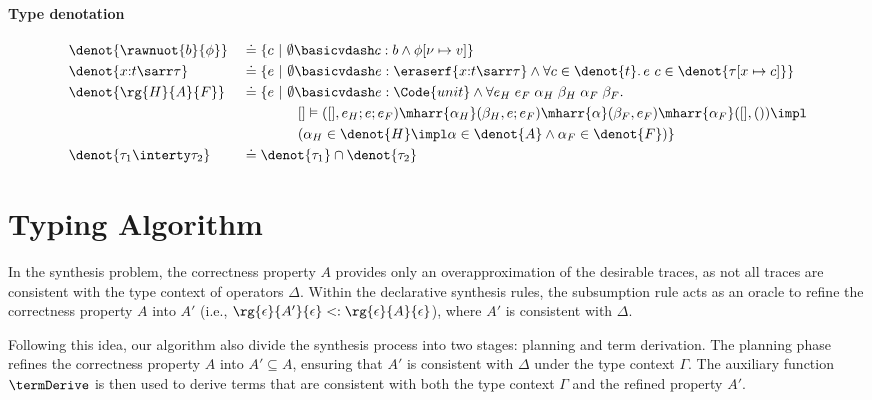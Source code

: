 \paragraph{Type denotation}
{\footnotesize\begin{align*}
  &\denot{ \rawnuot{b}{\phi} } &&\doteq \{ c ~|~ \emptyset
                                       \basicvdash c : b \land
                                       \phi[\nu\mapsto v] \}
  \\ &\denot{ x{:}t\sarr\tau } &&\doteq \{ e ~|~ \emptyset \basicvdash e : \eraserf{x{:}t\sarr\tau} \land
                                           \forall c \in \denot{ t }.\, e\ c \in  \denot{ \tau[x\mapsto c ] } \}
  \\ &\denot{ \rg{H}{A}{F} } &&\doteq \{ e ~|~ \emptyset \basicvdash e : \Code{unit} \land \forall e_H\;e_F\;\alpha_H\;\beta_H\;\alpha_F\;\beta_F.
  \\&&& \qquad\qquad  [] \vDash ([], e_H;e;e_F) \mharr{\alpha_H} (\beta_H, e;e_F) \mharr{\alpha} (\beta_F, e_F) \mharr{\alpha_F} ([], ()) \impl
  \\&&& \qquad\qquad (\alpha_H \in\denot{H} \impl \alpha \in\denot{A} \land \alpha_F\in\denot{F}) \}
  \\ &\denot{ \tau_1 \interty \tau_2 } &&\doteq \denot{\tau_1} \cap \denot{\tau_2}
\end{align*}}

\section{Typing Algorithm}

In the synthesis problem, the correctness property $A$ provides only an overapproximation of the desirable traces, as not all traces are consistent with the type context of operators $\Delta$. Within the declarative synthesis rules, the subsumption rule acts as an oracle to refine the correctness property $A$ into $A'$ (i.e., $\rg{\epsilon}{A'}{\epsilon} <: \rg{\epsilon}{A}{\epsilon}$), where $A'$ is consistent with $\Delta$.

Following this idea, our algorithm also divide the synthesis process into two stages: planning and term derivation. The planning phase refines the correctness property $A$ into $A' \subseteq A$, ensuring that $A'$ is consistent with $\Delta$ under the type context $\Gamma$. The auxiliary function $\termDerive$ is then used to derive terms that are consistent with both the type context $\Gamma$ and the refined property $A'$.

